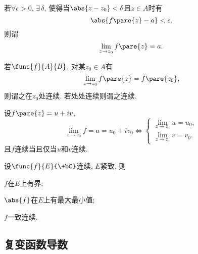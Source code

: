 \documentclass{ctexart}
\begin{document}
\begin{definition}[复变函数极限]
    若$\forall \epsilon>0$, $\exists\, \delta$, 使得当$\abs{z-z_0} < \delta$且$z\in A$时有
    \[ \abs{f\pare{z} - a} < \epsilon, \]
    则谓
    \[ \lim_{z\rightarrow z_0} f\pare{z} = a. \]
\end{definition}
\begin{definition}[复变函数连续]
    若$\func{f}{A}{B}$, 对某$z_0 \in A$有
    \[ \lim_{z\rightarrow z_0} f\pare{z} = f\pare{z_0}, \]
    则谓之在$z_0$处连续. 若处处连续则谓之连续.
\end{definition}
\begin{theorem}[函数极限作为实部和虚部的极限]
    设$f\pare{z} = u+iv$,
    \[ \lim_{z\rightarrow z_0} f = a = u_0 + iv_0\Leftrightarrow \begin{cases}
        \displaystyle \lim_{z \rightarrow z_0} u = u_0,\\
        \displaystyle \lim_{z \rightarrow z_0} v = v_0.
    \end{cases} \]
    且$f$连续当且仅当$u$和$v$连续.
\end{theorem}
\begin{theorem}
    设$\func{f}{E}{\+bC}$连续, $E$紧致, 则
    \begin{cenum}
        \item $f$在$E$上有界;
        \item $\abs{f}$在$E$上有最大最小值;
        \item $f$一致连续.
    \end{cenum}
\end{theorem}


\subsection{复变函数导数} %
\label{sub:复变函数导数}
\end{document}
